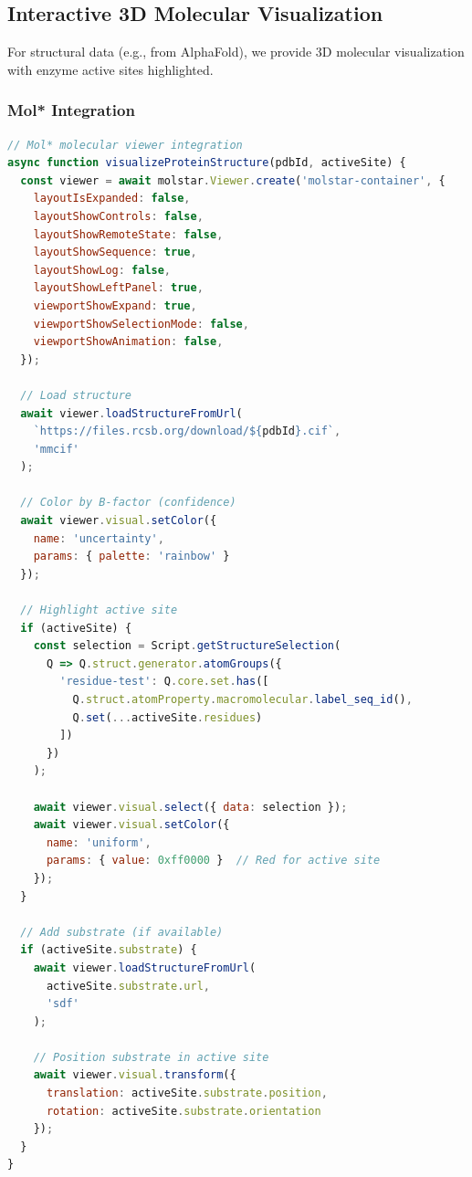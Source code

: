 \documentclass[12pt,a4paper]{article}
\begin{document}
\subsection{Interactive 3D Molecular Visualization}

For structural data (e.g., from AlphaFold), we provide 3D molecular visualization with enzyme active sites highlighted.

\subsubsection{Mol* Integration}

\begin{lstlisting}[language=JavaScript, basicstyle=\ttfamily\small]
// Mol* molecular viewer integration
async function visualizeProteinStructure(pdbId, activeSite) {
  const viewer = await molstar.Viewer.create('molstar-container', {
    layoutIsExpanded: false,
    layoutShowControls: false,
    layoutShowRemoteState: false,
    layoutShowSequence: true,
    layoutShowLog: false,
    layoutShowLeftPanel: true,
    viewportShowExpand: true,
    viewportShowSelectionMode: false,
    viewportShowAnimation: false,
  });
  
  // Load structure
  await viewer.loadStructureFromUrl(
    `https://files.rcsb.org/download/${pdbId}.cif`,
    'mmcif'
  );
  
  // Color by B-factor (confidence)
  await viewer.visual.setColor({
    name: 'uncertainty',
    params: { palette: 'rainbow' }
  });
  
  // Highlight active site
  if (activeSite) {
    const selection = Script.getStructureSelection(
      Q => Q.struct.generator.atomGroups({
        'residue-test': Q.core.set.has([
          Q.struct.atomProperty.macromolecular.label_seq_id(),
          Q.set(...activeSite.residues)
        ])
      })
    );
    
    await viewer.visual.select({ data: selection });
    await viewer.visual.setColor({
      name: 'uniform',
      params: { value: 0xff0000 }  // Red for active site
    });
  }
  
  // Add substrate (if available)
  if (activeSite.substrate) {
    await viewer.loadStructureFromUrl(
      activeSite.substrate.url,
      'sdf'
    );
    
    // Position substrate in active site
    await viewer.visual.transform({
      translation: activeSite.substrate.position,
      rotation: activeSite.substrate.orientation
    });
  }
}
\end{lstlisting}
\end{document}
